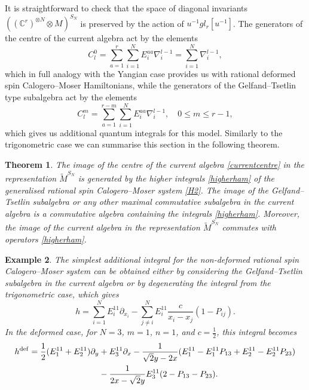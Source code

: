 \documentclass[12pt]{amsart}
\numberwithin{equation}{section}
\newtheorem{theorem}{Theorem}[section]
\newtheorem{example}[theorem]{Example}
\theoremstyle{definition}
\begin{document}
It is straightforward to check that the space of 
diagonal invariants $((\mathbb{C}^r)^{\otimes N} \otimes M)^{S_N}$ is 
preserved by the action of $u^{-1} gl_r [u^{-1}]$.
The generators of the centre of the current algebra act by the elements
\begin{equation} \label{currentcentre}
    C^0_l = \sum\limits_{a = 1}^r \sum\limits_{i = 1}^N E^{aa}_i \nabla_i^{l - 1} = \sum\limits_{i = 1}^N \nabla_i^{l - 1},
\end{equation}
which in full analogy with the Yangian case provides us with rational 
deformed spin Calogero--Moser Hamiltonians, while the generators of 
the Gelfand--Tsetlin type subalgebra act by the elements 
\begin{equation}
    \label{GToper}
    C^m_l = \sum\limits_{a = 1}^{r - m} \sum\limits_{i = 1}^N E^{aa}_i \nabla_i^{l - 1}, \quad 0 \leq m \leq r - 1,
\end{equation}
which gives us additional quantum integrals for this model. 
Similarly to the trigonometric case we can summarise this 
section in the following theorem.
\begin{theorem}
    The image of the centre of the current algebra \eqref{currentcentre} in the
    representation
    $\widetilde{M}^{S_N}$ is generated by
    the higher integrals \eqref{higherham} of the generalised rational spin
    Calogero--Moser system \eqref{H2}.
    The image of the Gelfand--Tsetlin subalgebra or any other maximal commutative 
    subalgebra in the current algebra is a commutative algebra containing the 
    integrals \eqref{higherham}. Moreover,
    the image of the current algebra in the representation $\widetilde{M}^{S_N}$ 
    commutes with operators \eqref{higherham}.
\end{theorem}

\begin{example}
    The simplest additional integral for the non-deformed rational spin Calogero--Moser system can be obtained either by considering the Gelfand--Tsetlin subalgebra
    in the current algebra or by degenerating the integral from the trigonometric
    case, which gives
    \begin{equation*}
        h = \sum\limits_{i = 1}^N E^{11}_i \partial_{x_i} - \sum\limits_{j \neq
        i}^N E^{11}_i \frac{c}{x_i - x_j} (1 - P_{ij}).
    \end{equation*}
    In the deformed case, for $N = 3$, $m = 1$, $n = 1$, and $c = 
    \frac{1}{2}$, this integral  becomes
     \begin{align*}
        h^{\rm def}  = \frac{1}{2}(E^{11}_1 + E^{11}_2) \partial_y &+ E^{11}_3
        \partial_{x} -   \frac{1}{\sqrt{2} y - 2x} 
        (E^{11}_1 - E^{11}_1 P_{13} + E^{11}_2 - E_2^{11} P_{23})  \\ 
        &- \frac{1}{ 2x - \sqrt{2}y} E^{11}_3 
        (2 - P_{13} - P_{23}).
    \end{align*}
\end{example}
\end{document}
